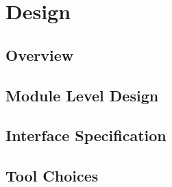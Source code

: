 \documentclass[10pt]{article}
\begin{document}
\section{Design}

\subsection{Overview}


\subsection{Module Level Design}


\subsection{Interface Specification}


\subsection{Tool Choices}

\end{document}
